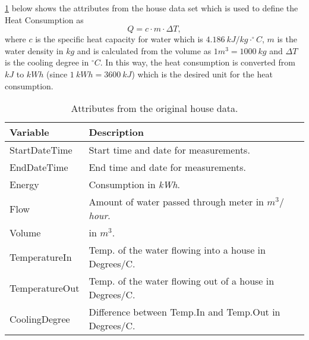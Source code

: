 \noindent \cref{tab: housedata} below shows the attributes from the house data set which is used to define the Heat Consumption as
\begin{equation}
    Q = c\cdot m \cdot \Delta T,
    \label{eq: Q_heat}
\end{equation}
where $c$ is the specific heat capacity for water which is $4.186 \ kJ/kg\cdot ^{\circ}C$, $m$ is the water density in $kg$ and is calculated from the volume as $1m^3 = 1000 \ kg$ and $\Delta T$ is the cooling degree in $^{\circ}C$. In this way, the heat consumption is converted from $kJ$ to $kWh$ (since $1 \ kWh = 3600 \ kJ$) which is the desired unit for the heat consumption. 
\begin{table}[H]
    \centering
    \begin{tabular}{ll}
     \hline
     \textbf{Variable} & \textbf{Description} \\
    \hline
    \hline
    StartDateTime  &  Start time and date for measurements.\\
    EndDateTime  &  End time and date for measurements.\\
    Energy  &  Consumption in \textit{kWh}.\\
    Flow  &  Amount of water passed through meter in \textit{$m^3/$hour}.\\
    Volume & in $m^3$.\\
    TemperatureIn  &  Temp. of the water flowing into a house in Degrees/C. \\
    TemperatureOut  & Temp. of the water flowing out of a house in Degrees/C.\\
    CoolingDegree  &  Difference between Temp.In and Temp.Out in Degrees/C. \\
    \hline
    \end{tabular}
    \caption{Attributes from the original house data.}
    \label{tab: housedata}
\end{table}

